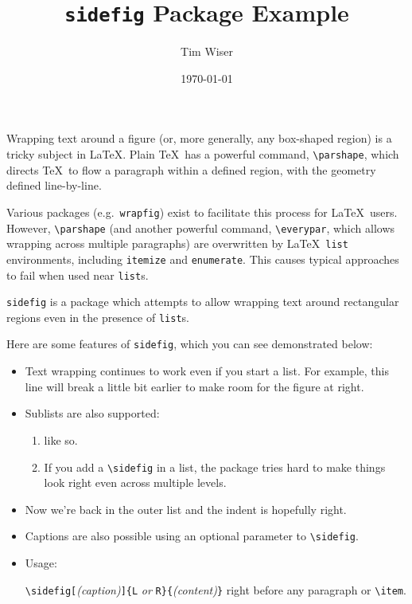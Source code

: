 \documentclass{article}
\begin{document}
	\title{\texttt{sidefig} Package Example}
	\author{Tim Wiser}
	\date{\today}
	
	\maketitle

	\newsavebox\samplebox
	
	Wrapping text around a figure (or, more generally, any box-shaped region) is a tricky subject in \LaTeX.
	Plain \TeX\ has a powerful command, \verb|\parshape|, which directs \TeX\ to flow a paragraph within a defined region, with the geometry defined line-by-line.
	
	Various packages (e.g.~\texttt{wrapfig}) exist to facilitate this process for \LaTeX\ users.
	However, \verb|\parshape| (and another powerful command, \verb|\everypar|, which allows wrapping across multiple paragraphs) are overwritten by \LaTeX\ \verb|list| environments, including \verb|itemize| and \verb|enumerate|.
	This causes typical approaches to fail when used near \verb|list|s.
	
	\texttt{sidefig} is a package which attempts to allow wrapping text around rectangular regions even in the presence of \texttt{list}s.


	Here are some features of \texttt{sidefig}, which you can see demonstrated below:
	\begin{itemize}

		\item Text wrapping continues to work even if you start a list.
		For example, this line will break a little bit earlier to make room for the figure at right.
		
		\item Sublists are also supported:
		

		\begin{enumerate}
			
			\item like so.

			\item If you add a \verb|\sidefig| in a list, the package tries hard to make things look right even across multiple levels.
		\end{enumerate}
		
		\item Now we're back in the outer list and the indent is hopefully right.
			
		\item Captions are also possible using an optional parameter to \verb|\sidefig|.
		
		\item Usage:
		
		\verb|\sidefig[|\emph{(caption)}\verb|]{L|\emph{ or }\verb|R}{|\emph{(content)}\verb|}| right before any paragraph or \verb|\item|.
	\end{itemize}
	
\end{document}
